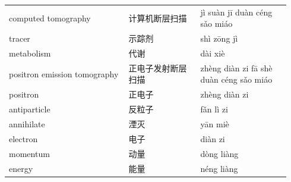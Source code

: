\documentclass[11pt]{article}
\begin{document}
\begin{longtable}{@{}p{0.40\linewidth}p{0.24\linewidth}p{0.30\linewidth}@{}}
computed tomography & 计算机断层扫描 & jì suàn jī duàn céng sǎo miáo \\
tracer & 示踪剂 & shì zōng jì \\
metabolism & 代谢 & dài xiè \\
positron emission tomography & 正电子发射断层扫描 & zhèng diàn zi fā shè duàn céng sǎo miáo \\
positron & 正电子 & zhèng diàn zi \\
antiparticle & 反粒子 & fǎn lì zi \\
annihilate & 湮灭 & yān miè \\
electron & 电子 & diàn zi \\
momentum & 动量 & dòng liàng \\
energy & 能量 & néng liàng \\
\end{longtable}
\end{document}
